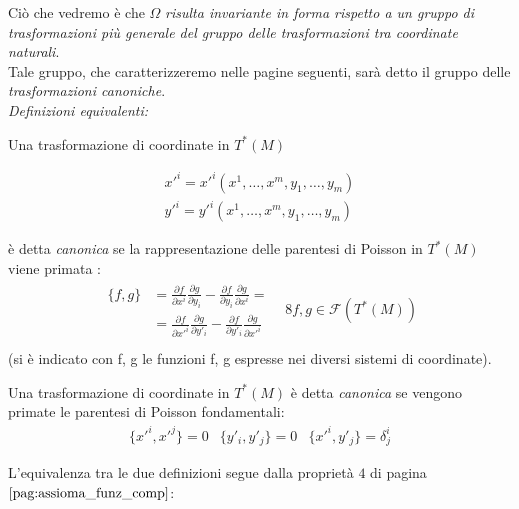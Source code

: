Ciò che vedremo è che $\Omega$ \textit{risulta invariante in forma rispetto a un gruppo di trasformazioni più generale del gruppo delle trasformazioni tra coordinate naturali}.\\
Tale gruppo, che caratterizzeremo nelle pagine seguenti, sarà detto il gruppo delle \textit{trasformazioni canoniche}. \\

\textit{Definizioni equivalenti:}
\begin{definition}
Una trasformazione di coordinate in $ T^* (M) $

\begin{align*}
x'^i = x'^i (x^1, \dots , x^m, y_1, \dots , y_m) \\
y'^i = y'^i (x^1, \dots , x^m, y_1, \dots , y_m)
\end{align*}

è detta \textit{canonica} se la rappresentazione delle parentesi di Poisson in $ T^* (M) $ viene primata :
\begin{equation*}
\begin{array}{cc}
\begin{aligned}
\{ f, g \} &= \frac{\partial f}{\partial x^i} \frac{\partial g}{\partial y_i} - \frac{\partial f}{\partial y_i} \frac{\partial g}{\partial x^i} = \\
&= \frac{\partial f}{\partial x'^i} \frac{\partial g}{\partial y'_i} - \frac{\partial f}{\partial y'_i} \frac{\partial g}{\partial x'^i}
\end{aligned}
&
\mathcal{8} f, g \in \mathcal{F} ( T^*(M)) \\
\end{array}
\end{equation*}
(si è indicato con f, g le funzioni f, g espresse nei diversi sistemi di coordinate).
\end{definition}

\begin{definition}
Una trasformazione di coordinate in $ T^* (M) $ è detta \textit{canonica} se vengono primate le parentesi di Poisson fondamentali:
\begin{eqnarray*}
\{x'^i,x'^j\}=0 & \{y'_i,y'_j\}=0 & \{x'^i,y'_j\}=\delta^{i}_{j}
\end{eqnarray*}
\end{definition}

L'equivalenza tra le due definizioni segue dalla proprietà $ 4 $ di pagina $ \pageref{pag:assioma_funz_comp}$:

